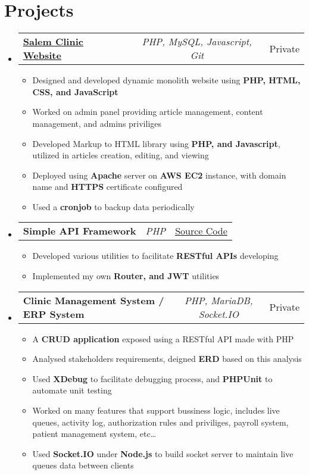 \documentclass[a4paper,11pt]{article}
\makeatletter
\newcommand{\resumeItem}[1]{
  \item\small{#1}
}
\newcommand{\resumeItemListStart}{\begin{itemize}[rightmargin=0.11in]}
\newcommand{\resumeItemListEnd}{\end{itemize}}
\newcommand{\resumeTrioHeading}[3]{
  \item\small{
    \begin{tabular*}{0.96\textwidth}[t]{
      l@{\extracolsep{\fill}}c@{\extracolsep{\fill}}r
    }
      \textbf{#1} & \textit{#2} & #3
    \end{tabular*}
  }
}
\newcommand{\resumeHeadingListStart}{
  \begin{itemize}[leftmargin=0.15in, label={}]
}
\newcommand{\resumeHeadingListEnd}{\end{itemize}}
\makeatother
\begin{document}
\section{Projects}
  \resumeHeadingListStart{}
      \resumeTrioHeading{\href{https://salem-clinic.com}{\uline{Salem Clinic Website}}}{PHP, MySQL, Javascript, Git}{Private}
      \resumeItemListStart{}
        \resumeItem{Designed and developed dynamic monolith website using \textbf{PHP, HTML, CSS, and JavaScript}}
        \resumeItem{Worked on admin panel providing article management, content management, and admins priviliges}
        \resumeItem{Developed Markup to HTML library using \textbf{PHP, and Javascript}, utilized in articles creation, editing, and viewing}
        \resumeItem{Deployed using \textbf{Apache} server on \textbf{AWS EC2} instance, with domain name and \textbf{HTTPS} certificate configured}
        \resumeItem{Used a \textbf{cronjob} to backup data periodically}
      \resumeItemListEnd{}

    \resumeTrioHeading{Simple API Framework}{PHP}{\href{https://github.com/Mohammed4mach/simple-api-framework}{\uline{Source Code}}}
      \resumeItemListStart{}
        \resumeItem{Developed various utilities to facilitate \textbf{RESTful APIs} developing}
        \resumeItem{Implemented my own \textbf{Router, and JWT} utilities}
      \resumeItemListEnd{}

      \resumeTrioHeading{Clinic Management System / ERP System}{PHP, MariaDB, Socket.IO}{Private}
      \resumeItemListStart{}
        \resumeItem{A \textbf{CRUD application} exposed using a RESTful API made with PHP}
        \resumeItem{Analysed stakeholders requirements, deigned \textbf{ERD} based on this analysis}
        \resumeItem{Used \textbf{XDebug} to facilitate debugging process, and \textbf{PHPUnit} to automate unit testing}
        \resumeItem{Worked on many features that support bussiness logic, includes live queues, activity log, authorization rules and priviliges, payroll system, patient management system, etc\ldots}
        \resumeItem{Used \textbf{Socket.IO} under \textbf{Node.js} to build socket server to maintain live queues data between clients}
      \resumeItemListEnd{}
  \resumeHeadingListEnd{}
\end{document}
